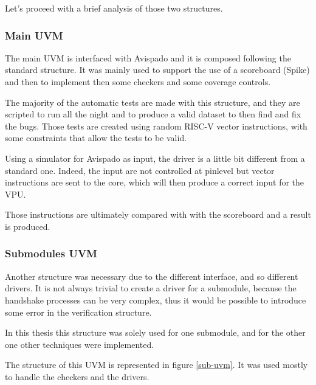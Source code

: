 Let's proceed with a brief analysis of those two structures.

\subsubsection{Main UVM}
The main UVM is interfaced with Avispado and it is composed following the standard structure. It was mainly used to support the use of a scoreboard (Spike) and then to implement then some checkers and some coverage controls.

The majority of the automatic tests are made with this structure, and they are scripted to run all the night and to produce a valid dataset to then find and fix the bugs. Those tests are created using random RISC-V vector instructions, with some constraints that allow the tests to be valid.

Using a simulator for Avispado as input, the driver is a little bit different from a standard one. Indeed, the input are not controlled at pinlevel but vector instructions are sent to the core, which will then produce a correct input for the VPU.

Those instructions are ultimately compared with with the scoreboard and a result is produced.

\subsubsection{Submodules UVM}

Another structure was necessary due to the different interface, and so different drivers. It is not always trivial to create a driver for a submodule, because the handshake processes can be very complex, thus it would be possible to introduce some error in the verification structure.

In this thesis this structure was solely used for one submodule, and for the other one other techniques were implemented.

The structure of this UVM is represented in figure \ref{sub-uvm}. It was used mostly to handle the checkers and the drivers.

